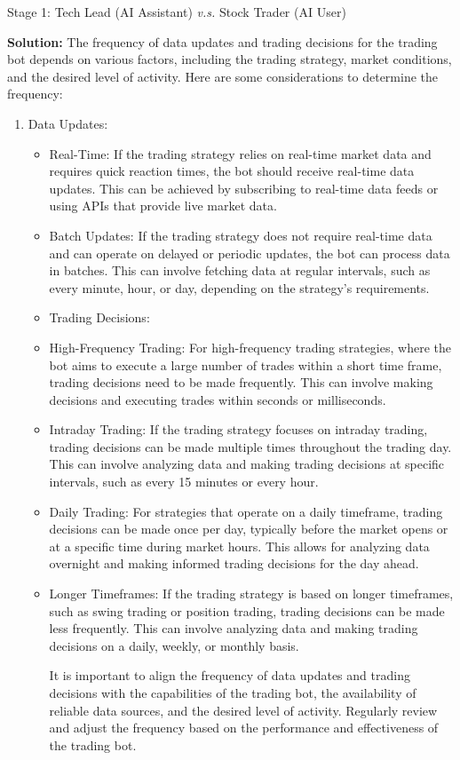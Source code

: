 \begin{AIBoxBreak}{Stage 1: Tech Lead (AI Assistant) \textit{v.s.} Stock Trader (AI User)}
\assistantmsg

\textbf{Solution:} The frequency of data updates and trading decisions for the trading bot depends on various factors, including the trading strategy, market conditions, and the desired level of activity. Here are some considerations to determine the frequency:

\begin{enumerate}
\item  Data Updates:
\begin{itemize}
\item Real-Time: If the trading strategy relies on real-time market data and requires quick reaction times, the bot should receive real-time data updates. This can be achieved by subscribing to real-time data feeds or using APIs that provide live market data.
\item Batch Updates: If the trading strategy does not require real-time data and can operate on delayed or periodic updates, the bot can process data in batches. This can involve fetching data at regular intervals, such as every minute, hour, or day, depending on the strategy’s requirements.

\item  Trading Decisions:
\item High-Frequency Trading: For high-frequency trading strategies, where the bot aims to execute a large number of trades within a short time frame, trading decisions need to be made frequently. This can involve making decisions and executing trades within seconds or milliseconds.
\item Intraday Trading: If the trading strategy focuses on intraday trading, trading decisions can be made multiple times throughout the trading day. This can involve analyzing data and making trading decisions at specific intervals, such as every 15 minutes or every hour.
\item Daily Trading: For strategies that operate on a daily timeframe, trading decisions can be made once per day, typically before the market opens or at a specific time during market hours. This allows for analyzing data overnight and making informed trading decisions for the day ahead.
\item Longer Timeframes: If the trading strategy is based on longer timeframes, such as swing trading or position trading, trading decisions can be made less frequently. This can involve analyzing data and making trading decisions on a daily, weekly, or monthly basis.

It is important to align the frequency of data updates and trading decisions with the capabilities of the trading bot, the availability of reliable data sources, and the desired level of activity. Regularly review and adjust the frequency based on the performance and effectiveness of the trading bot.


\end{itemize}
\end{enumerate}
\end{AIBoxBreak}
